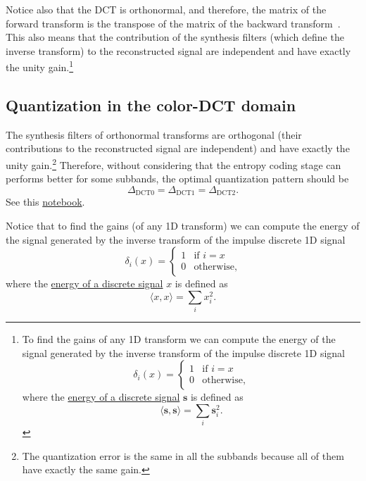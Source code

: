Notice also that the DCT is orthonormal, and therefore, the matrix of
the forward transform is the transpose of the matrix of the backward
transform~\cite{sayood2017introduction}. This also means that the
contribution of the synthesis filters (which define the inverse
transform) to the reconstructed signal are independent and have
exactly the unity gain.\footnote{To find the gains of any 1D transform
we can compute the energy of the signal generated by the inverse
transform of the impulse discrete 1D signal
\begin{equation}
  \delta_{i}(x) = 
  \left\{
  \begin{array}{ll}
    1 & \text{if $i=x$}\\
    0 & \text{otherwise},
  \end{array}
  \right.
\end{equation}
where the
\href{https://en.wikipedia.org/wiki/Energy_(signal_processing)}{energy
  of a discrete signal} ${\mathbf s}$ is defined as
\begin{equation}
  \langle {\mathbf s}, {\mathbf s} \rangle =  \sum_{i}{{\mathbf s}_i^2}.
\end{equation}
}

\subsection{Quantization in the color-DCT domain}
The synthesis filters of orthonormal transforms are orthogonal (their
contributions to the reconstructed signal are independent) and have
exactly the unity gain.\footnote{The quantization error is the same in
all the subbands because all of them have exactly the same gain.}
Therefore, without considering that the entropy coding stage can
performs better for some subbands, the optimal quantization pattern
should be
\begin{equation}
  \Delta_{\text{DCT0}} = \Delta_{\text{DCT1}} = \Delta_{\text{DCT2}}.
\end{equation}
See this \href{https://github.com/Sistemas-Multimedia/Sistemas-Multimedia.github.io/blob/master/study_guide/06-color_transform/color-DCT_compression.ipynb}{notebook}.

Notice that to find the gains (of any 1D transform) we can compute the
energy of the signal generated by the inverse transform of the impulse
discrete 1D signal
\begin{equation}
  \delta_{i}(x) = 
  \left\{
  \begin{array}{ll}
    1 & \text{if $i=x$}\\
    0 & \text{otherwise},
  \end{array}
  \right.
\end{equation}
where the
\href{https://en.wikipedia.org/wiki/Energy_(signal_processing)}{energy
  of a discrete signal} $x$ is defined as
\begin{equation}
  \langle x, x\rangle =  \sum_{i}{x_i^2}.
\end{equation}

